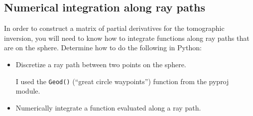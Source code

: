 \documentclass[11pt,titlepage,fleqn]{article}
\begin{document}
\subsection*{Numerical integration along ray paths}

In order to construct a matrix of partial derivatives for the tomographic inversion, you will need to know how to integrate functions along ray paths that are on the sphere. Determine how to do the following in Python:

\begin{itemize}
\item Discretize a ray path between two points on the sphere.

I used the \verb+Geod()+ (``great circle waypoints'') function from the pyproj module.

\item Numerically integrate a function evaluated along a ray path.

\end{itemize}



\end{document}
